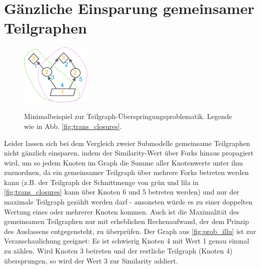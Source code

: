 \pagebreak %

\section{Gänzliche Einsparung gemeinsamer Teilgraphen} \label{sec:skip_entirely}

\begin{figure}
	\centering
	\vspace{-30pt} %
	\includegraphics[width=0.30\textwidth]{Bilder/problem_illustration.pdf}
	\vspace{-10pt}
	\caption[Minimalbeispiel zur Teilgraph-Überspringungs-Problematik. Legende wie in \autoref{fig:trans_closures}.]{\unskip}
	Minimalbeispiel zur Teilgraph-Überspringungsproblematik. Legende wie in Abb. \ref{fig:trans_closures}.
	\label{fig:prob_illu}
\end{figure}

Leider lassen sich bei dem Vergleich zweier Submodelle gemeinsame Teilgraphen nicht gänzlich einsparen, indem der Similarity-Wert über Forks hinaus propagiert wird, um so jedem Knoten im Graph die Summe aller Knotenwerte unter ihm zuzuordnen, da ein gemeinsamer Teilgraph über mehrere Forks betreten werden kann (z.B. der Teilgraph der Schnittmenge von grün und lila in \autoref{fig:trans_closures} kann über Knoten 6 und 5 betreten werden) und nur der maximale Teilgraph gezählt werden darf - ansonsten würde es zu einer doppelten Wertung eines oder mehrerer Knoten kommen. Auch ist die Maximalität  des gemeinsamen Teilgraphen nur mit erheblichen Rechenaufwand, der dem Prinzip des Auslassens entgegensteht, zu überprüfen. Der Graph aus \autoref{fig:prob_illu} ist zur Veranschaulichung geeignet: Es ist schwierig Knoten 4 mit Wert 1 genau einmal zu zählen. Wird Knoten 3 betreten und der restliche Teilgraph (Knoten 4) übersprungen, so wird der Wert 3 zur Similarity addiert.
